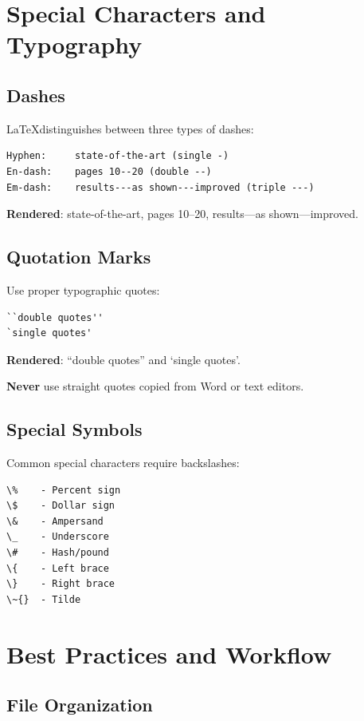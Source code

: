 \section*{Special Characters and Typography}

\subsection*{Dashes}

\LaTeX distinguishes between three types of dashes:

\begin{verbatim}
Hyphen:     state-of-the-art (single -)
En-dash:    pages 10--20 (double --)
Em-dash:    results---as shown---improved (triple ---)
\end{verbatim}

\textbf{Rendered}: state-of-the-art, pages 10--20, results---as shown---improved.

\subsection*{Quotation Marks}

Use proper typographic quotes:

\begin{verbatim}
``double quotes''
`single quotes'
\end{verbatim}

\textbf{Rendered}: ``double quotes'' and `single quotes'.

\textbf{Never} use straight quotes copied from Word or text editors.

\subsection*{Special Symbols}

Common special characters require backslashes:

\begin{verbatim}
\%    - Percent sign
\$    - Dollar sign
\&    - Ampersand
\_    - Underscore
\#    - Hash/pound
\{    - Left brace
\}    - Right brace
\~{}  - Tilde
\end{verbatim}

\section*{Best Practices and Workflow}

\subsection*{File Organization}

